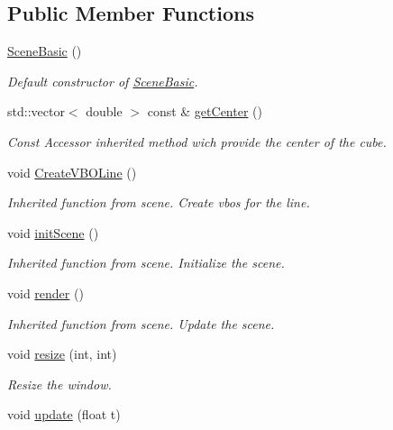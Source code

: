 \subsection*{Public Member Functions}
\begin{DoxyCompactItemize}
\item 
\hyperlink{class_scene_basic_a4eedd794e7e095992bda1566f2e3bd2e}{Scene\+Basic} ()
\begin{DoxyCompactList}\small\item\em Default constructor of \hyperlink{class_scene_basic}{Scene\+Basic}. \end{DoxyCompactList}\item 
std\+::vector$<$ double $>$ const  \& \hyperlink{class_scene_basic_ac805ba94deedc1f4d606d9554d088ea0}{get\+Center} ()
\begin{DoxyCompactList}\small\item\em Const Accessor inherited method wich provide the center of the cube. \end{DoxyCompactList}\item 
void \hyperlink{class_scene_basic_ac0cc945b040983d7527cda36963ec711}{Create\+V\+B\+O\+Line} ()
\begin{DoxyCompactList}\small\item\em Inherited function from scene. Create vbos for the line. \end{DoxyCompactList}\item 
void \hyperlink{class_scene_basic_a0575ddd74a9f9a5f238def19657f275e}{init\+Scene} ()
\begin{DoxyCompactList}\small\item\em Inherited function from scene. Initialize the scene. \end{DoxyCompactList}\item 
void \hyperlink{class_scene_basic_a8cfaad3ce6a4586e088b8d55d0e23ea6}{render} ()
\begin{DoxyCompactList}\small\item\em Inherited function from scene. Update the scene. \end{DoxyCompactList}\item 
void \hyperlink{class_scene_basic_af8a829370fa5e7386f46b5b659f3a083}{resize} (int, int)
\begin{DoxyCompactList}\small\item\em Resize the window. \end{DoxyCompactList}\item 
void \hyperlink{class_scene_basic_a40b11f479361056d418edbf0a14c9a59}{update} (float t)

\end{DoxyCompactItemize}

